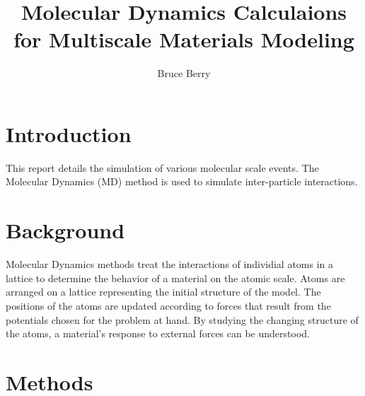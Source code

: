\documentclass[11pt]{report}
\begin{document}
    \title{Molecular Dynamics Calculaions for Multiscale Materials Modeling}
    \author{Bruce Berry}
    \maketitle

    \section{Introduction}
    This report details the simulation of various molecular scale events.  The Molecular Dynamics (MD) method is used to simulate inter-particle interactions.

    \section{Background}
    Molecular Dynamics methods treat the interactions of individial atoms in a lattice to determine the behavior of a material on the atomic scale.  Atoms are arranged on a lattice representing the initial structure of the model.  The positions of the atoms are updated according to forces that result from the potentials chosen for the problem at hand.  By studying the changing structure of the atoms, a material's response to external forces can be understood.

    \section{Methods}
\end{document}

